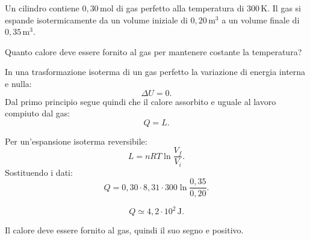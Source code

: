 
\begin{esercizio}
Un cilindro contiene \(0{,}30\,\mathrm{mol}\) di gas perfetto alla temperatura
di \(300\,\mathrm{K}\). Il gas si espande isotermicamente da un volume iniziale
di \(0{,}20\,\mathrm{m^3}\) a un volume finale di \(0{,}35\,\mathrm{m^3}\).

Quanto calore deve essere fornito al gas per mantenere costante la temperatura?
\end{esercizio}

\begin{soluzione}
In una trasformazione isoterma di un gas perfetto la variazione di energia
interna e nulla:
\[
\Delta U=0.
\]
Dal primo principio segue quindi che il calore assorbito e uguale al lavoro
compiuto dal gas:
\[
Q=L.
\]

Per un'espansione isoterma reversibile:
\[
L=nRT\ln\frac{V_f}{V_i}.
\]
Sostituendo i dati:
\[
Q=0{,}30\cdot 8{,}31\cdot 300
\ln\frac{0{,}35}{0{,}20}.
\]

\[
Q\simeq 4{,}2\cdot 10^2\,\mathrm{J}.
\]

Il calore deve essere fornito al gas, quindi il suo segno e positivo.
\end{soluzione}
